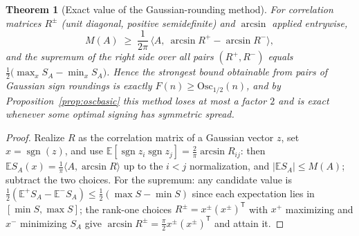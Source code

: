 \documentclass[11pt]{article}
\newtheorem{theorem}{Theorem}[section]
\theoremstyle{remark}
\newcommand{\E}{\mathbb E}
\newcommand{\Osc}{\mathrm{Osc}}
\begin{document}
\begin{theorem}[Exact value of the Gaussian-rounding method]\label{thm:varid}
For correlation matrices $R^\pm$ (unit diagonal, positive
semidefinite) and $\arcsin$ applied entrywise,
\[
 M(A)\;\ge\;\frac1{2\pi}\,
 \bigl\langle A,\ \arcsin R^+-\arcsin R^-\bigr\rangle ,
\]
and the supremum of the right side over all pairs $(R^+,R^-)$ equals
$\tfrac12\bigl(\max_xS_A-\min_xS_A\bigr)$. Hence the strongest bound
obtainable from pairs of Gaussian sign roundings is exactly
$F(n)\ge\Osc_{1/2}(n)$, and by Proposition~\ref{prop:oscbasic} this
method loses at most a factor $2$ and is exact whenever some optimal
signing has symmetric spread.
\end{theorem}
\begin{proof}
Realize $R$ as the correlation matrix of a Gaussian vector $z$, set
$x=\operatorname{sgn}(z)$, and use
$\E[\operatorname{sgn}z_i\operatorname{sgn}z_j]=\tfrac2\pi\arcsin R_{ij}$:
then $\E S_A(x)=\tfrac1\pi\langle A,\arcsin R\rangle$ up to the
$i<j$ normalization, and $|\E S_A|\le M(A)$; subtract the two choices.
For the supremum: any candidate value is
$\tfrac12(\E^+S_A-\E^-S_A)\le\tfrac12(\max S-\min S)$ since each
expectation lies in $[\min S,\max S]$; the rank-one choices
$R^\pm=x^\pm(x^\pm)^{\mathsf T}$ with $x^+$ maximizing and $x^-$
minimizing $S_A$ give
$\arcsin R^\pm=\tfrac\pi2x^\pm(x^\pm)^{\mathsf T}$ and attain it.
\end{proof}
\end{document}

